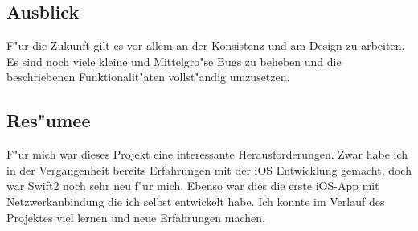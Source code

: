 \subsection{Ausblick}

F"ur die Zukunft gilt es vor allem an der Konsistenz und am Design zu arbeiten. Es sind noch viele kleine und Mittelgro"se Bugs zu beheben und die beschriebenen Funktionalit"aten vollst"andig umzusetzen. 

\subsection{Res"umee}

F"ur mich war dieses Projekt eine interessante Herausforderungen. Zwar habe ich in der Vergangenheit bereits Erfahrungen mit der iOS Entwicklung gemacht, doch war Swift2 noch sehr neu f"ur mich. 
Ebenso war dies die erste iOS-App mit Netzwerkanbindung die ich selbst entwickelt habe. 
Ich konnte im Verlauf des Projektes viel lernen und neue Erfahrungen machen. 
